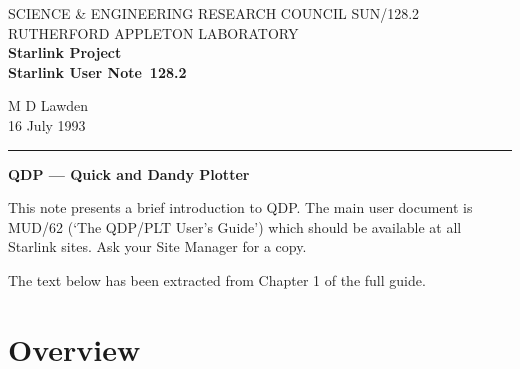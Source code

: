 \pagestyle{myheadings}

\newcommand{\stardoccategory}  {Starlink User Note}
\newcommand{\stardocinitials}  {SUN}
\newcommand{\stardocnumber}    {128.2}
\newcommand{\stardocauthors}   {M D Lawden}
\newcommand{\stardocdate}      {16 July 1993}
\newcommand{\stardoctitle}     {QDP --- Quick and Dandy Plotter}

\newcommand{\stardocname}{\stardocinitials /\stardocnumber}
\renewcommand{\_}{{\tt\char'137}}     %
\markright{\stardocname}
\setlength{\textwidth}{160mm}
\setlength{\textheight}{230mm}
\setlength{\topmargin}{-2mm}
\setlength{\oddsidemargin}{0mm}
\setlength{\evensidemargin}{0mm}
\setlength{\parindent}{0mm}
\setlength{\parskip}{\medskipamount}
\setlength{\unitlength}{1mm}


\thispagestyle{empty}
SCIENCE \& ENGINEERING RESEARCH COUNCIL \hfill \stardocname\\
RUTHERFORD APPLETON LABORATORY\\
{\large\bf Starlink Project\\}
{\large\bf \stardoccategory\ \stardocnumber}
\begin{flushright}
\stardocauthors\\
\stardocdate
\end{flushright}
\vspace{-4mm}
\rule{\textwidth}{0.5mm}
\vspace{5mm}
\begin{center}
{\Large\bf \stardoctitle}
\end{center}
\vspace{5mm}

This note presents a brief introduction to QDP.
The main user document is MUD/62 (`The QDP/PLT User's Guide') which should be
available at all Starlink sites.
Ask your Site Manager for a copy.

The text below has been extracted from Chapter 1 of the full guide.

\section{Overview}

